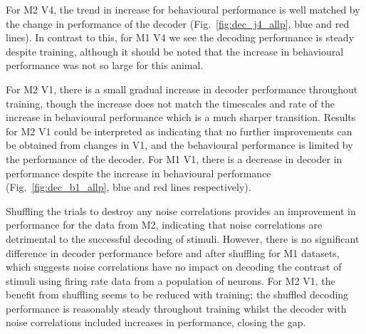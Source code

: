 For \ac{M2} \ac{V4}, the trend in increase for behavioural performance is well matched by the change in performance of the decoder (Fig.~\ref{fig:dec_j4_allp}, blue and red lines).
In contrast to this, for \ac{M1} \ac{V4} we see the decoding performance is steady despite training, although it should be noted that the increase in behavioural performance was not so large for this animal.

For \ac{M2} \ac{V1}, there is a small gradual increase in decoder performance throughout training, though the increase does not match the timescales and rate of the increase in behavioural performance which is a much sharper transition.
Results for \ac{M2} \ac{V1} could be interpreted as indicating that no further improvements can be obtained from changes in \ac{V1}, and the behavioural performance is limited by the performance of the decoder.
For \ac{M1} \ac{V1}, there is a decrease in decoder in performance despite the increase in behavioural performance (Fig.~\ref{fig:dec_b1_allp}, blue and red lines respectively).


Shuffling the trials to destroy any noise correlations provides an improvement in performance for the data from \ac{M2}, indicating that noise correlations are detrimental to the successful decoding of stimuli.
However, there is no significant difference in decoder performance before and after shuffling for \ac{M1} datasets, which suggests noise correlations have no impact on decoding the contrast of stimuli using firing rate data from a population of neurons.
For \ac{M2} \ac{V1}, the benefit from shuffling seems to be reduced with training; the shuffled decoding performance is reasonably steady throughout training whilst the decoder with noise correlations included increases in performance, closing the gap.




